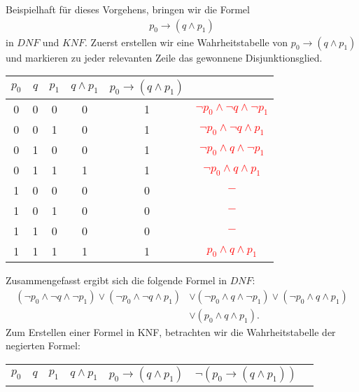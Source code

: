 \begin{bsp}
    Beispielhaft für dieses Vorgehens, bringen wir die Formel
    \begin{align*}
        p_0\to (q\land p_1)
    \end{align*}
    in $DNF$ und $KNF$. Zuerst erstellen wir eine Wahrheitstabelle von $p_0\to (q\land p_1)$ und markieren zu jeder relevanten Zeile das gewonnene Disjunktionsglied.
    \begin{center}
        \begin{tabular} {| c | c | c || c | c | c |}
            \hline
            $p_0$ & $q$ & $p_1$ & $q\land p_1$ & $p_0\to (q\land p_1)$ & \\
            \hline
            0 & 0 & 0 & 0 & 1 & \textcolor{red}{$\neg p_0 \land \neg q\land \neg p_1$}\\
            0 & 0 & 1 & 0 & 1 & \textcolor{red}{$\neg p_0 \land \neg q\land      p_1$}\\
            0 & 1 & 0 & 0 & 1 & \textcolor{red}{$\neg p_0 \land      q\land \neg p_1$}\\
            0 & 1 & 1 & 1 & 1 & \textcolor{red}{$\neg p_0 \land      q\land      p_1$}\\
            1 & 0 & 0 & 0 & 0 & \textcolor{red}{$-$}\\
            1 & 0 & 1 & 0 & 0 & \textcolor{red}{$-$}\\
            1 & 1 & 0 & 0 & 0 & \textcolor{red}{$-$}\\
            1 & 1 & 1 & 1 & 1 & \textcolor{red}{$     p_0 \land      q\land      p_1$}\\
            \hline
        \end{tabular}
    \end{center}
    \smallskip
    Zusammengefasst ergibt sich die folgende Formel in $DNF$:
    \begin{align*}
       (\neg p_0 \land \neg q\land \neg p_1)
       \lor (\neg p_0 \land \neg q\land      p_1)
       &\lor (\neg p_0 \land      q\land \neg p_1)
       \lor (\neg p_0 \land      q\land      p_1)\\
       &\lor      (p_0 \land      q\land      p_1).
    \end{align*}
    Zum Erstellen einer Formel in KNF, betrachten wir die Wahrheitstabelle der negierten Formel:
    \begin{center}
        \begin{tabular} {| c | c | c || c | c | c | c |}
            \hline
            $p_0$ & $q$ & $p_1$ & $q\land p_1$ & $p_0\to (q\land p_1)$ & $\neg(p_0\to (q\land p_1))$ & \\

\end{tabular}
\end{center}
\end{bsp}
